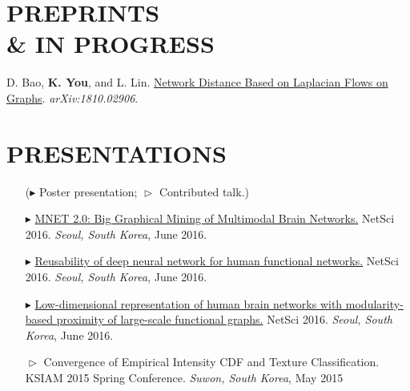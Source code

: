 \documentclass[margin, 10pt]{res} %
\begin{document}
\begin{resume}

\section{\sf PREPRINTS \\ \& IN PROGRESS} 

\begin{enumerate}[label={[\roman*]}] 
	\item D. Bao, \textbf{K. You}, and L. Lin. \href{https://arxiv.org/abs/1810.02906}{Network Distance Based on Laplacian Flows on Graphs}. {\it arXiv:1810.02906}.
\end{enumerate}
\vspace{.2cm}



\section{\sf PRESENTATIONS}

\begin{itemize}
	\item[]($\blacktriangleright$ Poster presentation; $\vartriangleright$ Contributed talk.)
	\item[$\blacktriangleright$] 
	\href{http://kyoustat.com/presentation/2016_NetSci_MNET.pdf}{MNET 2.0: Big Graphical Mining of Multimodal Brain Networks.} NetSci 2016. \emph{Seoul, South Korea}, June 2016.
	\item[$\blacktriangleright$]
	\href{http://kyoustat.com/presentation/2016_NetSci_DeepLearning.pdf}{Reusability of deep neural network for human functional networks.} NetSci 2016. \emph{Seoul, South Korea}, June 2016.
	\item[$\blacktriangleright$] 
	\href{http://kyoustat.com/presentation/2016_NetSci_LAMP.pdf}{Low-dimensional representation of human brain networks with modularity-based proximity of large-scale functional graphs.} NetSci 2016. \emph{Seoul, South Korea}, June 2016.
	\item[$\vartriangleright$]
	Convergence of Empirical Intensity CDF and Texture Classification. KSIAM 2015 Spring Conference. \emph{Suwon, South Korea}, May 2015
\end{itemize}


\end{resume}
\end{document}
